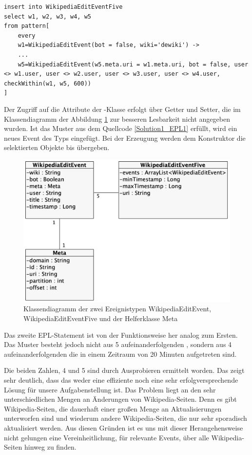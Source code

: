 \begin{lstlisting}[label=Solution1_EPL1,caption=Lösung 1: EPL-Statement 1,language=epl,firstnumber=1,captionpos=b]
insert into WikipediaEditEventFive
select w1, w2, w3, w4, w5
from pattern[
    every
    w1=WikipediaEditEvent(bot = false, wiki='dewiki') ->
    ...
    w5=WikipediaEditEvent(w5.meta.uri = w1.meta.uri, bot = false, user <> w1.user, user <> w2.user, user <> w3.user, user <> w4.user, checkWithin(w1, w5, 600))
]
\end{lstlisting}

Der Zugriff auf die Attribute der -Klasse erfolgt über Getter und Setter, die im Klassendiagramm
der Abbildung \ref{fig:class_diagram_eventtypes} zur besseren Lesbarkeit nicht angegeben wurden.
Ist das Muster aus dem Quellcode \ref{Solution1_EPL1} erfüllt, wird ein neues Event des Typs 
eingefügt. Bei der Erzeugung werden dem Konstruktor die selektierten Objekte  bis  übergeben.

\begin{figure}[h]
    \includegraphics[width=.5\textwidth]{images/Esper1.png}
    \caption{Klassendiagramm der zwei Ereignistypen WikipediaEditEvent, WikipediaEditEventFive und der Helferklasse Meta}
    \label{fig:class_diagram_eventtypes}
\end{figure}

Das zweite EPL-Statement ist von der Funktionsweise her analog zum Ersten. Das Muster besteht jedoch nicht aus
5 aufeinanderfolgenden , sondern aus
4 aufeinanderfolgenden  die in einem Zeitraum von 20 Minuten aufgetreten sind.

Die beiden Zahlen, 4 und 5 sind durch Ausprobieren ermittelt worden. Das zeigt sehr deutlich, dass das weder eine
effiziente noch eine sehr erfolgversprechende Lösung für unsere Aufgabenstellung ist.
Das Problem liegt an den sehr unterschiedlichen Mengen an Änderungen von Wikipedia-Seiten.
Denn es gibt Wikipedia-Seiten, die dauerhaft einer großen Menge an Aktualisierungen unterworfen sind und wiederum andere Wikipedia-Seiten, die
nur sehr sporadisch aktualisiert werden. Aus diesen Gründen ist es uns mit dieser Herangehensweise
nicht gelungen eine Vereinheitlichung, für relevante Events, über alle Wikipedia-Seiten hinweg zu finden.

